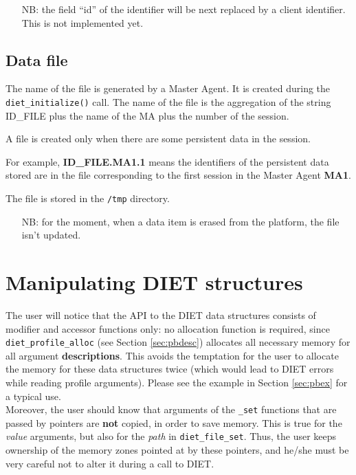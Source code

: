 \begin{itemize}
\item[NB:] the field ``id'' of the identifier will be next replaced by a
client identifier. This is not implemented yet.
\end{itemize}

\subsection{Data file}
\label{ssec:datafile}

The name of the file is generated by a Master Agent. It is created
during the \texttt{diet\_initialize()} call. The name of the file is
the aggregation of the string ID\_FILE plus the name of the MA plus
the number of the session.  

A file is created only when there are some persistent data in the
session.  

For example, \textbf{ID\_FILE.MA1.1} means the identifiers
of the persistent data stored are in the file corresponding to the
first session in the Master Agent \textbf{MA1}.

The file is stored in the \texttt{/tmp} directory.

\begin{itemize}
\item[NB:] for the moment, when a data item is erased from the platform, the
file isn't updated.
\end{itemize}


\section{Manipulating DIET structures}
\label{sec:manip}

The user will notice that the API to the DIET data structures consists of
modifier and accessor functions only: no allocation function is required, since
\texttt{diet\_profile\_alloc} (see Section \ref{sec:pbdesc}) allocates all
necessary memory for all argument \textbf{descriptions}. This avoids the
temptation for the user to allocate the memory for these data structures twice
(which would lead to DIET errors while reading profile arguments). Please see
the example in Section \ref{sec:pbex} for a typical use.
\\

Moreover, the user should know that arguments of the \texttt{\_set} functions
that are passed by pointers are \textbf{not} copied, in order to save memory.
This is true for the \emph{value} arguments, but also for the \emph{path} in
\texttt{diet\_file\_set}. Thus, the user keeps ownership of the memory zones
pointed at by these pointers, and he/she must be very careful not to alter it
during a call to DIET.


